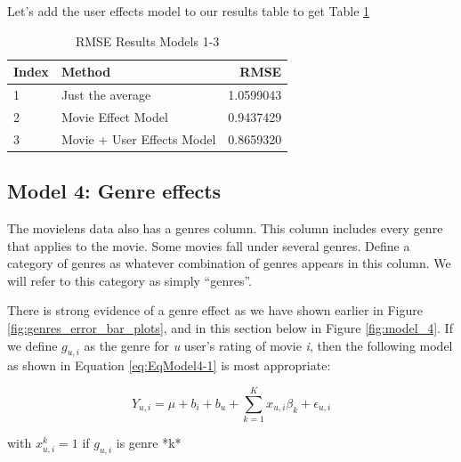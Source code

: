 \documentclass[
]{article}
\begin{document}
Let's add the user effects model to our results table to get Table
\ref{tbl:rmse_results_model_1-3}

\begin{table}[H]

\caption{\label{tab:ue_6}RMSE Results Models 1-3\label{tbl:rmse_results_model_1-3}}
\centering
\fontsize{7}{9}\selectfont
\begin{tabular}[t]{llr}
\toprule
Index & Method & RMSE\\
\midrule
1 & Just the average & 1.0599043\\
2 & Movie Effect Model & 0.9437429\\
3 & Movie + User Effects Model & 0.8659320\\
\bottomrule
\end{tabular}
\end{table}

\newpage

\hypertarget{model-4-genre-effects}{%
\subsection{Model 4: Genre effects}\label{model-4-genre-effects}}

The movielens data also has a genres column. This column includes every
genre that applies to the movie. Some movies fall under several genres.
Define a category of genres as whatever combination of genres appears in
this column. We will refer to this category as simply ``genres''.

There is strong evidence of a genre effect as we have shown earlier in
Figure \ref{fig:genres_error_bar_plots}, and in this section below in
Figure \ref{fig:model_4}. If we define \(g_{u,i}\) as the genre for
\emph{u} user's rating of movie \emph{i}, then the following model as
shown in Equation \ref{eq:EqModel4-1} is most appropriate:

%
\par

\label{eq:EqModel4-1} \begin{equation}
  Y_{u,i} = \mu + b_{i} + b_{u} + \sum_{k=1}^Kx_{u,i}\beta_k + \epsilon_{u,i}
\end{equation}

\begin{center}
with $x_{u,i}^k=1$ if $g_{u,i}$ is genre *k*
\end{center}
\end{document}
